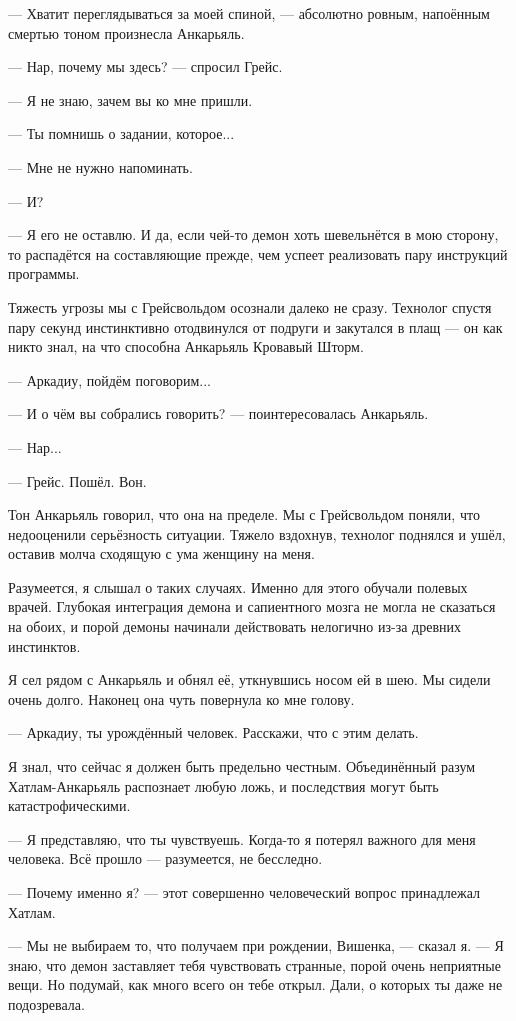 --- Хватит переглядываться за моей спиной, --- абсолютно ровным, напоённым смертью тоном произнесла Анкарьяль.

--- Нар, почему мы здесь? --- спросил Грейс.

--- Я не знаю, зачем вы ко мне пришли.

--- Ты помнишь о задании, которое...

--- Мне не нужно напоминать.

--- И?

--- Я его не оставлю.
И да, если чей-то демон хоть шевельнётся в мою сторону, то распадётся на составляющие прежде, чем успеет реализовать пару инструкций программы.

Тяжесть угрозы мы с Грейсвольдом осознали далеко не сразу.
Технолог спустя пару секунд инстинктивно отодвинулся от подруги и закутался в плащ --- он как никто знал, на что способна Анкарьяль Кровавый Шторм.

--- Аркадиу, пойдём поговорим...

--- И о чём вы собрались говорить? --- поинтересовалась Анкарьяль.

--- Нар...

--- Грейс. Пошёл. Вон.

Тон Анкарьяль говорил, что она на пределе.
Мы с Грейсвольдом поняли, что недооценили серьёзность ситуации.
Тяжело вздохнув, технолог поднялся и ушёл, оставив молча сходящую с ума женщину на меня.

Разумеется, я слышал о таких случаях.
Именно для этого обучали полевых врачей.
Глубокая интеграция демона и сапиентного мозга не могла не сказаться на обоих, и порой демоны начинали действовать нелогично из-за древних инстинктов.

Я сел рядом с Анкарьяль и обнял её, уткнувшись носом ей в шею.
Мы сидели очень долго.
Наконец она чуть повернула ко мне голову.

--- Аркадиу, ты урождённый человек.
Расскажи, что с этим делать.

Я знал, что сейчас я должен быть предельно честным.
Объединённый разум Хатлам-Анкарьяль распознает любую ложь, и последствия могут быть катастрофическими.

--- Я представляю, что ты чувствуешь.
Когда-то я потерял важного для меня человека.
Всё прошло --- разумеется, не бесследно.

--- Почему именно я? --- этот совершенно человеческий вопрос принадлежал Хатлам.

--- Мы не выбираем то, что получаем при рождении, Вишенка, --- сказал я.
--- Я знаю, что демон заставляет тебя чувствовать странные, порой очень неприятные вещи.
Но подумай, как много всего он тебе открыл.
Дали, о которых ты даже не подозревала.

